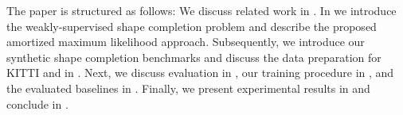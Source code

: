 The paper is structured as follows: We discuss related work in . In  we introduce the weakly-supervised shape completion problem and describe the proposed amortized maximum likelihood approach. Subsequently, we introduce our synthetic shape completion benchmarks and discuss the data preparation for KITTI and \Kinect in . Next, we discuss evaluation in , our training procedure in , and the evaluated baselines in . Finally, we present experimental results in  and conclude in .